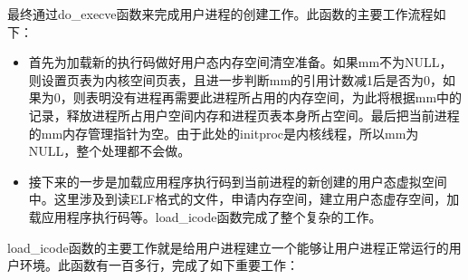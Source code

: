 最终通过do\_execve函数来完成用户进程的创建工作。此函数的主要工作流程如下：

\begin{itemize}
\item
  首先为加载新的执行码做好用户态内存空间清空准备。如果mm不为NULL，则设置页表为内核空间页表，且进一步判断mm的引用计数减1后是否为0，如果为0，则表明没有进程再需要此进程所占用的内存空间，为此将根据mm中的记录，释放进程所占用户空间内存和进程页表本身所占空间。最后把当前进程的mm内存管理指针为空。由于此处的initproc是内核线程，所以mm为NULL，整个处理都不会做。
\item
  接下来的一步是加载应用程序执行码到当前进程的新创建的用户态虚拟空间中。这里涉及到读ELF格式的文件，申请内存空间，建立用户态虚存空间，加载应用程序执行码等。load\_icode函数完成了整个复杂的工作。
\end{itemize}

load\_icode函数的主要工作就是给用户进程建立一个能够让用户进程正常运行的用户环境。此函数有一百多行，完成了如下重要工作：


